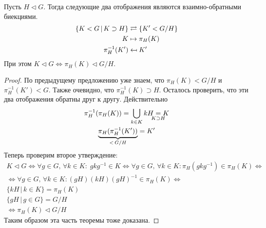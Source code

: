 \documentclass[../main.tex]{subfiles}
\begin{document}
\begin{theorem}[о соответствии]
  Пусть $H \triangleleft G$. Тогда следующие два отображения являются взаимно-обратными биекциями.
  \begin{align*}
    \{K < G \, | \, K \supset H\} &\rightleftarrows \{K' < G/H\} \\
    K &\mapsto \pi_H(K) \\
    \pi_H^{-1}(K') &\leftmapsto K'
  \end{align*}
  При этом $K \triangleleft G \iff \pi_H(K) \triangleleft G/H$.
\end{theorem}
\begin{proof}
  По предыдущему предложению уже знаем, что $\pi_H(K) < G/H$ и $\pi_H^{-1}(K') < G$. Также очевидно, что $\pi_H^{-1}(K) \supset H$. Осталось проверить, что эти два отображения обратны друг к другу. Действительно
  \begin{equation*}
    \begin{gathered}
      \pi_H^{-1}(\pi_H(K)) = \bigcup\limits_{k \in K} kH \underset{\mathclap{K \supset H}}{=} K \\
      \underbrace{\pi_H(\pi_H^{-1}(K'))}_{\mathclap{ < \,G/H}} = K'
    \end{gathered}
  \end{equation*}
  Теперь проверим второе утверждение:
  \begin{equation*}
    \begin{gathered}
      K \triangleleft G \iff \forall g \in G, \, \forall k \in K\colon \; gkg^{-1} \in K
      \iff \forall g \in G, \, \forall k \in K\colon \pi_H(gkg^{-1}) \in \pi_H(K) \iff \\
      \iff \forall g \in G, \, \forall k \in K\colon (gH)(kH)(gH)^{-1} \in \pi_H(K) \iff \\
      \{kH \, | \, k \in K\} = \pi_H(K) \\
      \{gH \, | \, g \in G\} = G/H \\
      \iff \pi_H(K) \triangleleft G/H
    \end{gathered}
  \end{equation*}
  Таким образом эта часть теоремы тоже доказана.
\end{proof}
\end{document}
